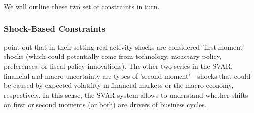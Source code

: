 \documentclass[a4paper,11pt,listof=nochaptergap,oneside,pointednumbers,bibtotoc,bigheadings,liststotoc,hidelinks]{scrbook}
\theoremstyle{mysatz}
\theoremstyle{mydefinition}
\theoremstyle{mytheorem}
\theoremstyle{mybemerkung}
\begin{document}
We will outline these two set of constraints in turn.

\subsubsection{Shock-Based Constraints}
\citet{ludvigsonetal:18} point out that in their setting real activity shocks are considered 'first moment' shocks (which could potentially come from technology, monetary policy, preferences, or fiscal policy innovations). The other two series in the SVAR, financial and macro uncertainty are types of 'second moment' - shocks that could be caused by expected volatility in financial markets or the macro economy, respectively. In this sense, the SVAR-system allows to understand whether shifts on first or second moments (or both) are drivers of business cycles.
\end{document}
